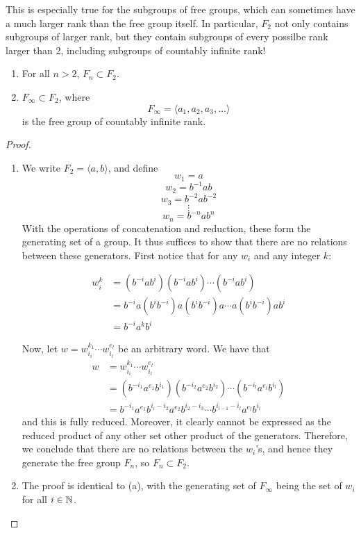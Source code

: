 This is especially true for the subgroups of free groups, which can sometimes have a much larger rank than the free group itself. In particular, $F_2$ not only contains subgroups of larger rank, but they contain subgroups of every possilbe rank larger than 2, including subgroups of countably infinite rank!

\begin{thm}\label{Free Groups Contain Subgroups of Arbitrarily Large Rank}
    \begin{enumerate}[label=(\alph*)]
        \item For all $n > 2$, $F_n \subset F_2$. 
        \item $F_\infty \subset F_2$, where
        \[F_\infty = \langle a_1, a_2, a_3, \ldots \rangle\]
        is the free group of countably infinite rank. 
    \end{enumerate}
\end{thm}

\begin{proof}
    \begin{enumerate}[label=(\alph*)]
        \item We write $F_2 = \langle a,b \rangle$, and define 
        \[w_1 = a\]
        \[w_2 = b^{-1}ab\]
        \[w_3 = b^{-2}ab^{-2}\]
        \[\vdots\]
        \[w_n = b^{-n}ab^n\]
        With the operations of concatenation and reduction, these form the generating set of a group. It thus suffices to show that there are no relations between these generators. First notice that for any $w_i$ and any integer $k$:

        \begin{align*}
            w_i^k & = (b^{-i}ab^i)(b^{-i}ab^i)\cdots(b^{-i}ab^i) \\
            & = b^{-i}a(b^ib^{-i})a(b^ib^{-i})a\cdots a(b^ib^{-i})ab^i \\
            & = b^{-i}a^kb^i
        \end{align*}

        Now, let $w = w_{i_i}^{k_1}\cdots w_{i_l}^{e_l}$ be an arbitrary word. We have that 
        \begin{align*}
            w & = w_{i_i}^{k_1}\cdots w_{i_l}^{e_l} \\
            & = (b^{-i_1}a^{e_1}b^{i_1})(b^{-i_2}a^{e_2}b^{i_2})\cdots(b^{-i_l}a^{e_l}b^{i_l}) \\
            & = b^{-i_1}a^{e_1}b^{i_i - i_2}a^{e_2}b^{i_2 - i_3} \cdots b^{i_{l-1} - i_l}a^{e_l}b^{i_l}
        \end{align*}
        and this is fully reduced. Moreover, it clearly cannot be expressed as the reduced product of any other set other product of the generators. Therefore, we conclude that there are no relations between the $w_i$'s, and hence they generate the free group $F_n$, so $F_n \subset F_2$.

        \item The proof is identical to (a), with the generating set of $F_\infty$ being the set of $w_i$ for all $i \in \mathbb{N}$.
    \end{enumerate}
\end{proof}

